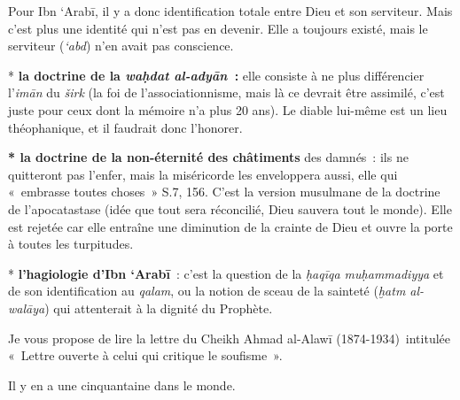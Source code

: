 Pour Ibn `Arabī, il y a donc identification totale entre Dieu et son
serviteur. Mais c'est plus une identité qui n'est pas en devenir. Elle a
toujours existé, mais le serviteur (\emph{`abd}) n'en avait pas
conscience.

* \textbf{la doctrine de la \emph{waḥdat al-adyān~}:} elle consiste à ne
plus différencier l'\emph{imān} du \emph{širk} (la foi de
l'associationnisme, mais là ce devrait être assimilé, c'est juste pour
ceux dont la mémoire n'a plus 20 ans). Le diable lui-même est un lieu
théophanique, et il faudrait donc l'honorer.

\textbf{* la doctrine de la non-éternité des châtiments} des damnés~:
ils ne quitteront pas l'enfer, mais la miséricorde les enveloppera
aussi, elle qui «~embrasse toutes choses~» S.7, 156. C'est la version
musulmane de la doctrine de l'apocatastase (idée que tout sera
réconcilié, Dieu sauvera tout le monde). Elle est rejetée car elle
entraîne une diminution de la crainte de Dieu et ouvre la porte à toutes
les turpitudes.

* \textbf{l'hagiologie d'Ibn `Arabī}~: c'est la question de la
\emph{ḥaqīqa muḥammadiyya} et de son identification au \emph{qalam}, ou
la notion de sceau de la sainteté (\emph{ḫatm al-walāya}) qui
attenterait à la dignité du Prophète.




Je vous propose de lire la lettre du Cheikh Ahmad al-Alawī
(1874-1934)~intitulée «~Lettre ouverte à celui qui critique le
soufisme~».


Il y en a une cinquantaine dans le monde.

